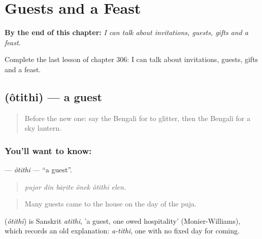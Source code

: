 
\chapter{Guests and a Feast}
\label{ch:bn-guests-and-a-feast}

\begin{chapteropening}
\textbf{By the end of this chapter:} \emph{I can talk about invitations, guests, gifts and a feast.}

Complete the last lesson of chapter 306: I can talk about invitations, guests, gifts and a feast.
\end{chapteropening}

\section[\texorpdfstring{\bn{অতিথি} (ôtithi)}{অতিথি (ôtithi)}]{ (ôtithi) — a guest}

\label{lesson:BN-C306-otithi}



\begin{quote}
Before the new one: say the Bengali for to glitter, then the Bengali for a sky lantern.
\end{quote}

\subsection*{You'll want to know: }
\textbf{} — \emph{ôtithi} — \textquotedblleft{}a guest\textquotedblright{}.

\begin{quote}
     
\end{quote}

\begin{quote}
\emph{pujor din bāṛite ônek ôtithi elen.}
\end{quote}

\begin{quote}
Many guests came to the house on the day of the puja.
\end{quote}

\begin{cousinweb}
\textbf{} (\emph{ôtithi}) is Sanskrit \emph{atithi}, 'a guest, one owed hospitality' (Monier-Williams), which records an old explanation: \emph{a-tithi}, one with no fixed day for coming.
\end{cousinweb}

